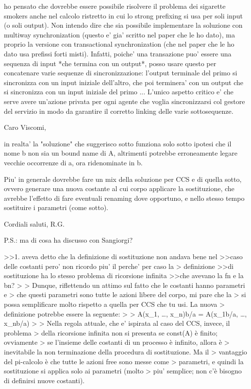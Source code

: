 

ho pensato che dovrebbe essere possibile risolvere il problema dei sigarette smokers anche nel calcolo ristretto in cui lo strong prefixing si usa per soli input (o soli output). Non intendo dire che sia possibile implementare la soluzione con multiway synchronization (questo e' gia' scritto nel paper che le ho dato), ma proprio la versione con transactional synchronization (che nel paper che le ho dato usa prefissi forti misti). Infatti, poiche' una transazione puo' essere una sequenza di input *che termina con un output*, posso usare questo per concatenare varie sequenze di sincronizzazione: l'output terminale del primo si sincronizza con un input iniziale dell'altro, che poi terminera' con un output che si sincronizza con un input iniziale del primo ... L'unico aspetto critico e' che serve avere un'azione privata per ogni agente che voglia sincronizzarsi col gestore del servizio in modo da garantire il corretto linking delle varie sottosequenze.






Caro Viscomi,

in realta' la "soluzione" che suggerisco sotto funziona solo sotto ipotesi
che il nome b non sia un bound name di A, altrimenti potrebbe
erroneamente legare vecchie occorrenze di a, ora ridenominate in b.

Piu' in generale dovrebbe fare un mix della soluzione per CCS e di quella
sotto, ovvero generare una nuova costante al cui corpo applicare la
sostituzione, che avrebbe l'effetto di fare eventuali renaming dove
opportuno, e nello stesso tempo sostituire i parametri (come sotto).

Cordiali saluti,
R.G.

P.S.: ma di cosa ha discusso con Sangiorgi?

>>1. aveva detto che la definizione di sostituzione non andava bene nel
>>caso delle costanti pero' non ricordo piu' il perche' per caso la
> definizione
>>di sostituzione ha lo stesso problema di ricorsione infinita
>>che avevano la fn e la bn?
>
> Dunque, riflettendo un attimo sul fatto che le costanti hanno parametri e
> che questi parametri sono tutte le azioni libere del corpo, mi pare che la
> si possa semplificare molto rispetto a quella per CCS che tu usi. La nuova
> definizione potrebbe essere la seguente:
>
>       A(x_1, …, x_n){b/a} = A(x_1{b/a}, …, x_n{b/a})
>
> Nella regola attuale, che e’ ispirata al caso del CCS, invece, il problema
> della ricorsione infinita non si presenta se const(A) è finito; ovviamente
> se l’insieme delle costanti di un processo è infinito, allora è
> inevitabile la non terminazione della procedura di sostituzione. Ma il
> vantaggio del pi-calcolo è che tutte le azioni free sono messe come
> parametri, e quindi la sostituzione si applica solo ai parametri (molto
> piu’ semplice; non c’è bisogno di definirsi nuove costanti).









